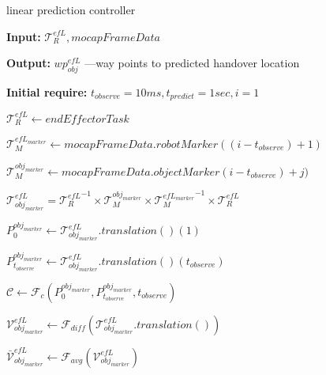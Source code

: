\documentclass[]{article}
\begin{document}
\begin{algorithm}[H]
		\caption{linear prediction controller}
		
	\begin{algorithmic}[1]
		
		\Statex\textbf{Input:} $\mathcal{T}^{efL}_R, mocapFrameData$
	
		\Statex\textbf{Output:}  $wp^{efL}_{obj}$ ---{way points to predicted handover location} %
	
		\Statex\textbf{Initial require:} $t_{observe}=10ms, t_{predict}=1sec, i=1 $\newline
		 
		 
		
		\newline
						
		\State $\mathcal{T}^{efL}_R\gets \textit{endEffectorTask}$

		\State $\mathcal{T}^{efL_{marker}}_M\gets \textit{mocapFrameData}.robotMarker((i-t_{observe})+1)$\newline
		

		      
		\State $\mathcal{T}^{obj_{marker}}_M\gets \textit{mocapFrameData}.objectMarker(i-t_{observe})+j)$	
		
		\State $\mathcal{T}^{efL}_{obj_{marker}} = {\mathcal{T}^{efL}_R}^{-1} \times  \mathcal{T}^{obj_{marker}}_M \times {\mathcal{T}^{efL_{marker}}_M}^{-1} \times  \mathcal{T}^{efL}_R$	
		
				
		\State $P^{obj_{marker}}_0 \gets \mathcal{T}^{efL}_{obj_{marker}}.translation()(1) $
		\EndIf 

		\State $P^{obj_{marker}}_{t_{observe}} \gets \mathcal{T}^{efL}_{obj_{marker}}.translation()(t_{observe}) $
		\EndIf
		
		
		\EndFor  \newline %
		
		\State $\mathcal{C} \gets \mathcal{F}_c( P^{obj_{marker}}_0, P^{obj_{marker}}_{t_{observe}}, t_{observe} )$
		
		\State $\mathcal{V}^{efL}_{obj_{marker}} \gets \mathcal{F}_{diff}({\mathcal{T}^{efL}_{obj_{marker}}.translation()})$
		
		
		\State $\mathcal{\bar{V}}^{efL}_{obj_{marker}} \gets \mathcal{F}_{avg}(\mathcal{V}^{efL}_{obj_{marker}})$\newline
		

\end{algorithmic}
\end{algorithm}
\end{document}

